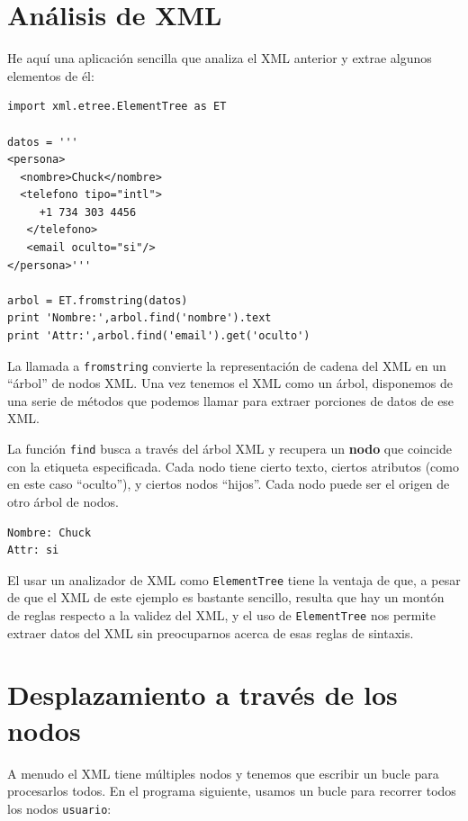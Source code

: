 \section{Análisis de XML}

He aquí una aplicación sencilla que analiza el XML anterior
y extrae algunos elementos de él:

\beforeverb
\begin{verbatim}
import xml.etree.ElementTree as ET

datos = '''
<persona>
  <nombre>Chuck</nombre>
  <telefono tipo="intl">
     +1 734 303 4456
   </telefono>
   <email oculto="si"/>
</persona>'''

arbol = ET.fromstring(datos)
print 'Nombre:',arbol.find('nombre').text
print 'Attr:',arbol.find('email').get('oculto')
\end{verbatim}
\afterverb
%
La llamada a {\tt fromstring} convierte la representación de cadena
del XML en un ``árbol'' de nodos XML. Una vez tenemos el XML
como un árbol, disponemos de una serie de métodos que podemos llamar para
extraer porciones de datos de ese XML.

La función {\tt find} busca a través del árbol XML
y recupera un {\bf nodo} que coincide con la etiqueta especificada.
Cada nodo tiene cierto texto, ciertos atributos (como en este caso ``oculto''), y
ciertos nodos ``hijos''. Cada nodo puede ser el origen de otro árbol de nodos.

\beforeverb
\begin{verbatim}
Nombre: Chuck
Attr: si
\end{verbatim}
\afterverb
%
El usar un analizador de XML como {\tt ElementTree} tiene la ventaja
de que, a pesar de que el XML de este ejemplo es bastante sencillo, resulta
que hay un montón de reglas respecto a la validez del XML, y el uso de
{\tt ElementTree} nos permite extraer datos del XML sin
preocuparnos acerca de esas reglas de sintaxis.

\section{Desplazamiento a través de los nodos}

A menudo el XML tiene múltiples nodos y tenemos que escribir un bucle
para procesarlos todos. En el programa siguiente,
usamos un bucle para recorrer todos los nodos {\tt usuario}:

